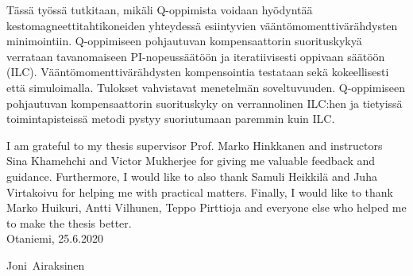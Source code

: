 \documentclass[english, 12pt, a4paper, elec, utf8, a-2b, online]{aaltothesis}
\begin{document}
\newpage

\begin{abstractpage}[finnish]
Tässä työssä tutkitaan, mikäli Q-oppimista voidaan hyödyntää kestomagneettitahtikoneiden yhteydessä esiintyvien vääntömomenttivärähdysten minimointiin. Q-oppimiseen pohjautuvan kompensaattorin suorituskykyä verrataan tavanomaiseen PI-nopeussäätöön ja iteratiivisesti oppivaan säätöön (ILC). Vääntömomenttivärähdysten kompensointia testataan sekä kokeellisesti että simuloimalla. Tulokset vahvistavat menetelmän soveltuvuuden. Q-oppimiseen pohjautuvan kompensaattorin suorituskyky on verrannolinen ILC:hen ja tietyissä toimintapisteissä metodi pystyy suoriutumaan paremmin kuin ILC.
\end{abstractpage}

\newpage


I am grateful to my thesis supervisor Prof. Marko Hinkkanen and instructors Sina Khamehchi and Victor Mukherjee for giving me valuable feedback and guidance. Furthermore, I would like to also thank Samuli Heikkilä and Juha Virtakoivu for helping me with practical matters. Finally, I would like to thank Marko Huikuri, Antti Vilhunen, Teppo Pirttioja and everyone else who helped me to make the thesis better.\\

\vspace{5cm}
Otaniemi, 25.6.2020

\vspace{5mm}
{\hfill Joni\ Airaksinen \hspace{1cm}}

\newpage

\thesistableofcontents

\end{document}
